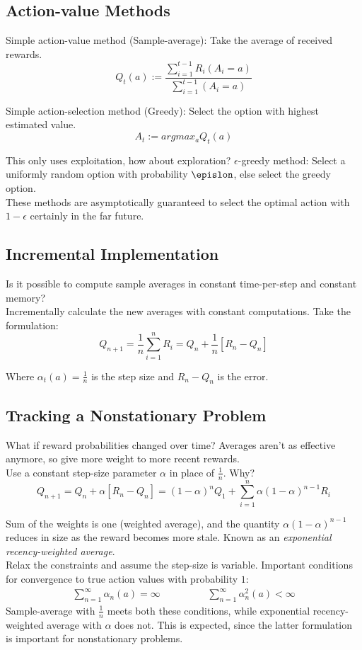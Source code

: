 \documentclass[a4paper]{article}
\begin{document}
\subsection{Action-value Methods}
Simple action-value method (Sample-average): Take the average of received rewards. $$Q_t(a) := \frac{\sum_{i=1}^{t-1}R_i(A_i = a)}{\sum_{i=1}^{t-1}(A_i = a)}$$

Simple action-selection method (Greedy): Select the option with highest estimated value. $$A_t := argmax_aQ_t(a)$$

This only uses exploitation, how about exploration? $\epsilon$-greedy method: Select a uniformly random option with probability $\epislon$, else select the greedy option.\\
These methods are asymptotically guaranteed to select the optimal action with $1 - \epsilon$ certainly in the far future.

\subsection{Incremental Implementation}
Is it possible to compute sample averages in constant time-per-step and constant memory?\\

Incrementally calculate the new averages with constant computations. Take the formulation: $$Q_{n+1} = \frac{1}{n}\sum_{i=1}^nR_i = Q_n + \frac{1}{n}[R_n - Q_n]$$

Where $\alpha_t(a) = \frac{1}{n}$ is the step size and $R_n - Q_n$ is the error.\\

\subsection{Tracking a Nonstationary Problem}
What if reward probabilities changed over time? Averages aren't as effective anymore, so give more weight to more recent rewards.\\

Use a constant step-size parameter $\alpha$ in place of $\frac{1}{n}$. Why? $$Q_{n+1} = Q_n + \alpha[R_n - Q_n] = (1 - \alpha)^nQ_1 + \sum_{i=1}^n\alpha(1 - \alpha)^{n-1}R_i$$

Sum of the weights is one (weighted average), and the quantity $\alpha(1 - \alpha)^{n-1}$ reduces in size as the reward becomes more stale. Known as an \textit{exponential recency-weighted average}.\\

Relax the constraints and assume the step-size is variable. Important conditions for convergence to true action values with probability $1$:\\
\begin{equation}
\begin{split}
    \sum_{n=1}^\infty\alpha_n(a) = \infty \hspace{2cm}
    \sum_{n=1}^\infty\alpha_n^2(a) < \infty
\end{split}
\end{equation}
Sample-average with $\frac{1}{n}$ meets both these conditions, while exponential recency-weighted average with $\alpha$ does not. This is expected, since the latter formulation is important for nonstationary problems.
\end{document}
